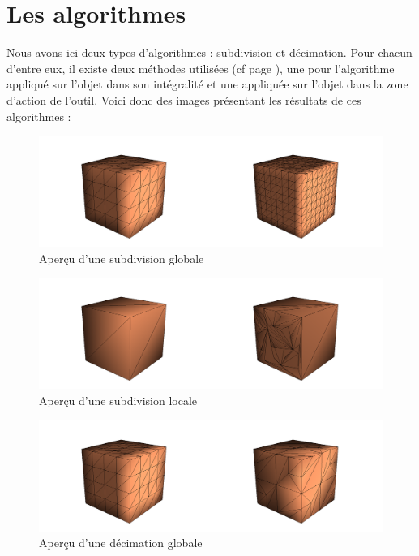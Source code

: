 \documentclass[a4paper]{memoir}
\begin{document}
		\section{Les algorithmes}
			Nous avons ici deux types d'algorithmes : subdivision et décimation. Pour chacun d'entre eux, il existe deux méthodes utilisées (cf page 
			\pageref{processing-dev}), une pour l'algorithme appliqué sur l'objet dans son intégralité et une appliquée sur l'objet dans la zone d'action de 
			l'outil. Voici donc des images présentant les résultats de ces algorithmes :
			\begin{figure}[H]
				\vspace{-0,5cm} \hspace{-2cm} \includegraphics[scale=0.27]{img/g-sub.png}
				\caption{Aperçu d'une subdivision globale}
			\end{figure}
			\begin{figure}[H]
				\vspace{-0,5cm} \hspace{-2cm} \includegraphics[scale=0.27]{img/l-sub.png}
				\caption{Aperçu d'une subdivision locale}
			\end{figure}
			\begin{figure}[H]
				\vspace{-0,5cm} \hspace{-2cm} \includegraphics[scale=0.27]{img/g-dec.png}
				\caption{Aperçu d'une décimation globale}
			\end{figure}
\end{document}
